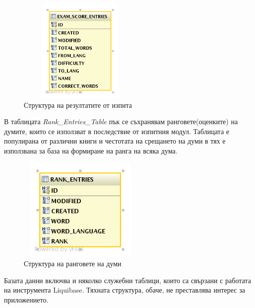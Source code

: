 \begin{figure}[htbp]
  \caption{Структура на резултатите от изпита}
  \centering
  \includegraphics[width=60mm, height=50mm]{images/exam_score_entries_diagram.png}
\end{figure}

В таблицата \emph{Rank\_Entries\_Table} пък се съхранявам
ранговете(оценките) на думите, които се използват в последствие от
изпитния модул. Таблицата е популирана от различни книги и честотата
на срещането на думи в тях е използвана за база на формиране на ранга
на всяка дума.

\begin{figure}[htbp]
  \caption{Структура на ранговете на думи}
  \centering
  \includegraphics[width=60mm, height=50mm]{images/rank_entries_table.png}
\end{figure}

Базата данни включва и няколко служебни таблици, които са свързани с
работата на инструмента Liquibase. Тяхната структура, обаче, не
преставлява интерес за приложението.


